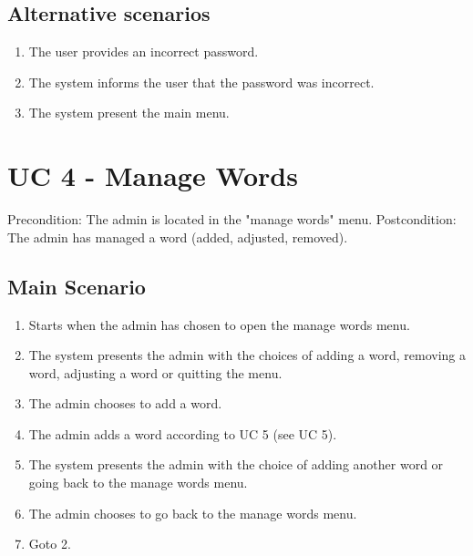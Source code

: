\documentclass[12pt, letterpaper]{article}
\begin{document}
\subsection{Alternative scenarios}
\begin{enumerate}[label=3.\arabic*]
	\item The user provides an incorrect password.
	\item The system informs the user that the password was incorrect.
	\item The system present the main menu.
\end{enumerate}
\section{UC 4 - Manage Words}
Precondition: The admin is located in the "manage words" menu.
\newline
Postcondition: The admin has managed a word (added, adjusted, removed).
\subsection{Main Scenario}
\begin{enumerate}
	\item Starts when the admin has chosen to open the manage words menu.
	\item The system presents the admin with the choices of adding a word, removing a word, adjusting a word or quitting the menu.
	\item The admin chooses to add a word.
	\item The admin adds a word according to UC 5 (see UC 5).
	\item The system presents the admin with the choice of adding another word or going back to the manage words menu.
	\item The admin chooses to go back to the manage words menu.
	\item Goto 2.
\end{enumerate}
\end{document}
